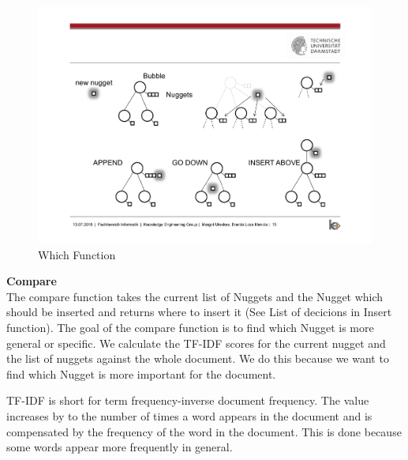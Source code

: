 \begin{figure}[H]
	\centering
	\includegraphics[trim=14cm 10cm 7cm 5.5cm, clip=true]{img/step2_func.pdf}
	\caption{Which Function}
	\label{fig:jsd}
\end{figure}


\textbf{Compare}\\

The compare function takes the current list of Nuggets and the Nugget which should be inserted and returns where to insert it (See List of decicions in Insert function). The goal of the compare function is to find which Nugget is more general or specific. We calculate the TF-IDF scores for the current nugget and the list of nuggets against the whole document. We do this because we want to find which Nugget is more important for the document.

TF-IDF is short for term frequency-inverse document frequency. The value increases by to the number of times a word appears in the document and is compensated by the frequency of the word in the document. This is done because some words appear more frequently in general. 




